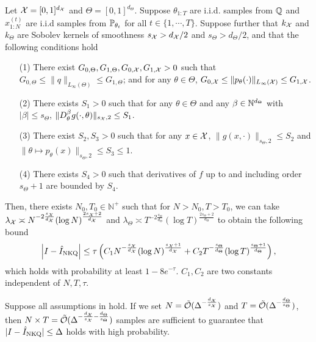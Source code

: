 \begin{thm}\label{thm:main}
Let $\mathcal{X} =[0,1]^{d_{\mathcal{X}}}$ and $\Theta =[0,1]^{d_\Theta}$. Suppose $\theta_{1:T}$ are i.i.d. samples from $\mathbb{Q}$ and $x_{1:N}^{(t)}$ are i.i.d samples from $\mathbb{P}_{\theta_t}$ for all $t \in \{1, \cdots, T\}$. 
Suppose further that $k_{\mathcal{X}}$ and $k_\Theta$ are Sobolev kernels of smoothness $s_{\mathcal{X}} > d_{\mathcal{X}} / 2$ and $s_\Theta > d_\Theta/2$, and that the following conditions hold
\begin{enumerate}[leftmargin=1.0cm]
    \item [(1)] There exist $G_{0, \Theta}, G_{1, \Theta}, G_{0, \mathcal{X}}, G_{1, \mathcal{X}} > 0$ such that $G_{0, \Theta} \leq \|q\|_{L_\infty(\Theta)} \leq G_{1, \Theta}$; and for any $\theta \in \Theta$,  $G_{0, \mathcal{X}} \leq \|p_\theta(\cdot) \|_{L_\infty(\mathcal{X})} \leq G_{1, \mathcal{X}}$.
    \item [(2)] There exists $S_1 >0$ such that for any $\theta \in \Theta$ and any $\beta \in \mathbb{N}^{d_\Theta}$ with $|\beta| \leq s_\Theta$, $\| D_\theta^\beta g(\cdot, \theta) \|_{ s_{\mathcal{X}},2 } \leq S_1$.
    \item[(3)] There exist $S_2,S_3 >0$ such that for any $x \in \mathcal{X}$, $\| g(x, \cdot) \|_{ s_\Theta ,2} \leq S_2$ and $\|\theta \mapsto p_\theta(x) \|_{ s_\Theta ,2} \leq S_3 \leq 1$. 
    \item[(4)] 
    There exists $S_4 >0$ such that derivatives of $f$ up to and including order $s_\Theta + 1$ are bounded by $S_4$.
\end{enumerate}
Then, there exists $N_0, T_0 \in \mathbb{N}^{+}$ such that for $N>N_0, T>T_0$, we can take $\lambda_{\mathcal{X}} \asymp N^{-2\frac{s_{\mathcal{X}}}{d_{\mathcal{X}}}} (\log N)^{\frac{2s_{\mathcal{X}}+2}{d_{\mathcal{X}}}}$ and $\lambda_{\Theta} \asymp T^{-2\frac{s_\Theta}{d_\Theta}} (\log T)^{\frac{2s_\Theta+2}{d_\Theta}}$ to obtain the following bound
\begin{align*}
    \left| I - \hat{I}_{\text{NKQ}} \right| \leq \tau \left( C_1 N^{- \frac{ s_{\mathcal{X}}}{d_{\mathcal{X}}} } (\log N)^{\frac{s_{\mathcal{X}}+1}{d_{\mathcal{X}}}} + C_2 T^{- \frac{ s_\Theta}{d_\Theta} } (\log T)^{\frac{s_\Theta+1}{d_\Theta}} \right), 
\end{align*}
which holds with probability at least $1 - 8 e^{-\tau}$.
$C_1, C_2$ are two constants independent of $N, T, \tau$.
\end{thm}
\begin{cor}\label{cor:nkq}
    Suppose all assumptions in  hold. If we set $N = \tilde{\mathcal{O}} (\Delta^{-\frac{d_{\mathcal{X}}}{s_{\mathcal{X}}} })$ and $T = \tilde{\mathcal{O}}(\Delta^{- \frac{d_\Theta}{s_\Theta}})$, then $N \times T = \tilde{\mathcal{O}}(\Delta^{-\frac{d_{\mathcal{X}}}{s_{\mathcal{X}}} - \frac{d_\Theta}{s_\Theta}})$ samples are sufficient to guarantee that $|I - \hat{I}_{\text{NKQ}}| \leq \Delta$ holds with high probability. 
\end{cor}
